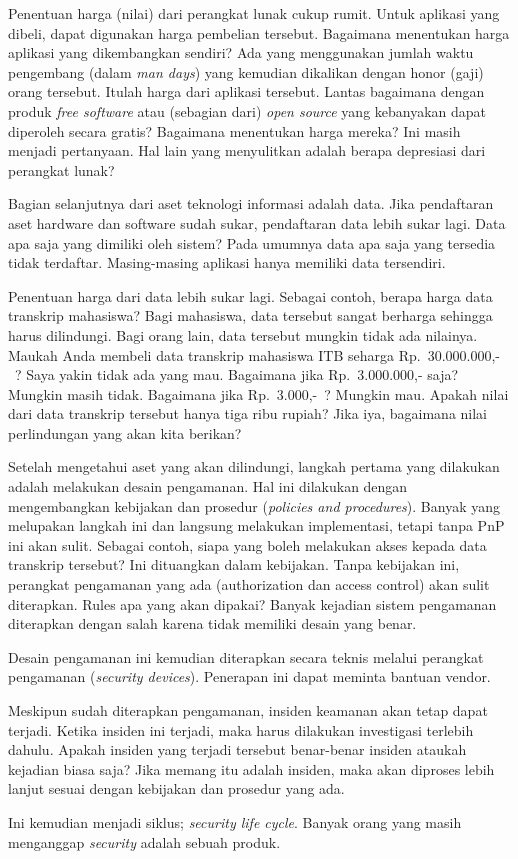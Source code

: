 Penentuan harga (nilai) dari perangkat lunak cukup rumit. Untuk aplikasi yang
dibeli, dapat digunakan harga pembelian tersebut. Bagaimana menentukan harga
aplikasi yang dikembangkan sendiri? Ada yang menggunakan jumlah waktu
pengembang (dalam {\em man days}) yang kemudian dikalikan dengan honor (gaji)
orang tersebut. Itulah harga dari aplikasi tersebut. Lantas bagaimana dengan
produk {\em free software} atau (sebagian dari) {\em open source} yang
kebanyakan dapat diperoleh secara gratis? Bagaimana menentukan harga mereka?
Ini masih menjadi pertanyaan. Hal lain yang menyulitkan adalah berapa
depresiasi dari perangkat lunak?

Bagian selanjutnya dari aset teknologi informasi adalah data. Jika pendaftaran
aset hardware dan software sudah sukar, pendaftaran data lebih sukar lagi. Data
apa saja yang dimiliki oleh sistem? Pada umumnya data apa saja yang tersedia
tidak terdaftar. Masing-masing aplikasi hanya memiliki data tersendiri.

Penentuan harga dari data lebih sukar lagi. Sebagai contoh, berapa harga data
transkrip mahasiswa? Bagi mahasiswa, data tersebut sangat berharga sehingga
harus dilindungi. Bagi orang lain, data tersebut mungkin tidak ada nilainya.
Maukah Anda membeli data transkrip mahasiswa ITB seharga Rp.~30.000.000,-~?
Saya yakin tidak ada yang mau. Bagaimana jika Rp.~3.000.000,- saja? Mungkin
masih tidak. Bagaimana jika Rp.~3.000,-~? Mungkin mau. Apakah nilai dari data
transkrip tersebut hanya tiga ribu rupiah? Jika iya, bagaimana nilai
perlindungan yang akan kita berikan?


Setelah mengetahui aset yang akan dilindungi, langkah pertama yang dilakukan
adalah melakukan desain pengamanan. Hal ini dilakukan dengan mengembangkan
kebijakan dan prosedur ({\em policies and procedures}). Banyak yang melupakan
langkah ini dan langsung melakukan implementasi, tetapi tanpa PnP ini akan
sulit. Sebagai contoh, siapa yang boleh melakukan akses kepada data transkrip
tersebut? Ini dituangkan dalam kebijakan. Tanpa kebijakan ini, perangkat
pengamanan yang ada (authorization dan access control) akan sulit diterapkan.
Rules apa yang akan dipakai? Banyak kejadian sistem pengamanan diterapkan
dengan salah karena tidak memiliki desain yang benar.

Desain pengamanan ini kemudian diterapkan secara teknis melalui perangkat
pengamanan ({\em security devices}). Penerapan ini dapat meminta bantuan
vendor. 

Meskipun sudah diterapkan pengamanan, insiden keamanan akan tetap dapat
terjadi. Ketika insiden ini terjadi, maka harus dilakukan investigasi terlebih
dahulu. Apakah insiden yang terjadi tersebut benar-benar insiden ataukah
kejadian biasa saja? Jika memang itu adalah insiden, maka akan diproses lebih
lanjut sesuai dengan kebijakan dan prosedur yang ada.

Ini kemudian menjadi siklus; {\em security life cycle}. Banyak orang yang masih
menganggap {\em security} adalah sebuah produk. 
